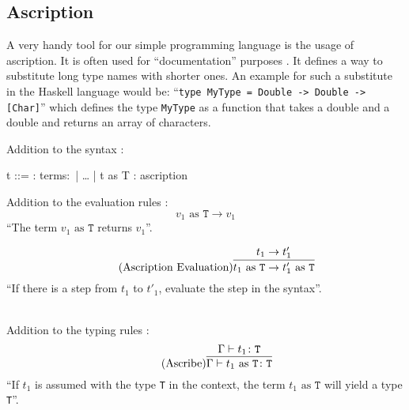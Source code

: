 \subsection{Ascription}

A very handy tool for our simple programming language is the usage of ascription.
It is often used for ``documentation'' purposes \cite{pierce2002ProgLang}. It defines
a way to substitute long type names with shorter ones. An example for such a substitute
in the Haskell language would be: ``\texttt{type MyType = Double -> Double -> [Char]}''
which defines the type \texttt{MyType} as a function that takes a double and a double
and returns an array of characters.

Addition to the syntax \cite{pierce2002ProgLang}:
\begin{bnfgrammar}
    t ::= : terms$\colon$
    | \dots
    | t as T : ascription
\end{bnfgrammar}\leavevmode\newline

Addition to the evaluation rules \cite{pierce2002ProgLang}:
\begin{equation*}
    \tag{Ascribe Value}
    v_1 \text{ as } \texttt{T} \rightarrow v_1
\end{equation*}
``The term $v_1 \text{ as } \texttt{T}$ returns $v_1$''.

\begin{equation*}
    \tag{Ascription Evaluation}
    \infer{
        t_1 \text{ as } \texttt{T} \rightarrow t'_1 \text{ as } \texttt{T}
    }{
        t_1 \rightarrow t'_1
    }
\end{equation*}
``If there is a step from $t_1$ to $t'_1$, evaluate the step
in the syntax''.

~\\
Addition to the typing rules \cite{pierce2002ProgLang}:
\begin{equation*}
    \tag{Ascribe}
    \infer{
        \Gamma \vdash t_1 \text{ as } \texttt{T} \colon \texttt{T}
    }{
        \Gamma \vdash t_1 \colon \texttt{T}
    }
\end{equation*}
``If $t_1$ is assumed with the type \texttt{T} in the context,
the term $t_1 \text{ as } \texttt{T}$ will yield a type \texttt{T}''.
